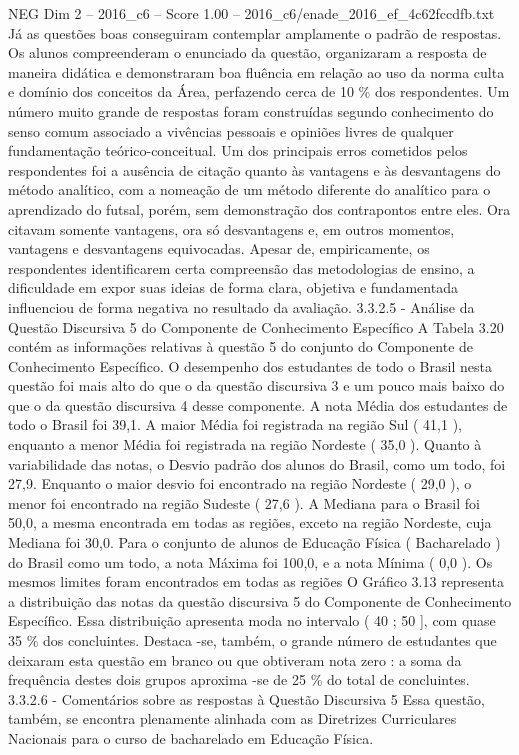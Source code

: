 \begin{textsample}{NEG Dim 2 – 2016\_c6 – Score 1.00 – 2016\_c6/enade\_2016\_ef\_4c62fccdfb.txt}
Já as questões boas conseguiram contemplar amplamente o padrão de respostas.
Os alunos compreenderam o enunciado da questão, organizaram a resposta de maneira didática e demonstraram boa fluência em relação ao uso da norma culta e domínio dos conceitos da Área, perfazendo cerca de 10 \% dos respondentes.
Um número muito grande de respostas foram construídas segundo conhecimento do senso comum associado a vivências pessoais e opiniões livres de qualquer fundamentação teórico-conceitual.
Um dos principais erros cometidos pelos respondentes foi a ausência de citação quanto às vantagens e às desvantagens do método analítico, com a nomeação de um método diferente do analítico para o aprendizado do futsal, porém, sem demonstração dos contrapontos entre eles.
Ora citavam somente vantagens, ora só desvantagens e, em outros momentos, vantagens e desvantagens equivocadas.
Apesar de, empiricamente, os respondentes identificarem certa compreensão das metodologias de ensino, a dificuldade em expor suas ideias de forma clara, objetiva e fundamentada influenciou de forma negativa no resultado da avaliação. 3.3.2.5 - Análise da Questão Discursiva 5 do Componente de Conhecimento Específico A Tabela 3.20 contém as informações relativas à questão 5 do conjunto do Componente de Conhecimento Específico.
O desempenho dos estudantes de todo o Brasil nesta questão foi mais alto do que o da questão discursiva 3 e um pouco mais baixo do que o da questão discursiva 4 desse componente.
A nota Média dos estudantes de todo o Brasil foi 39,1.
A maior Média foi registrada na região Sul ( 41,1 ), enquanto a menor Média foi registrada na região Nordeste ( 35,0 ).
Quanto à variabilidade das notas, o Desvio padrão dos alunos do Brasil, como um todo, foi 27,9.
Enquanto o maior desvio foi encontrado na região Nordeste ( 29,0 ), o menor foi encontrado na região Sudeste ( 27,6 ).
A Mediana para o Brasil foi 50,0, a mesma encontrada em todas as regiões, exceto na região Nordeste, cuja Mediana foi 30,0.
Para o conjunto de alunos de Educação Física ( Bacharelado ) do Brasil como um todo, a nota Máxima foi 100,0, e a nota Mínima ( 0,0 ).
Os mesmos limites foram encontrados em todas as regiões O Gráfico 3.13 representa a distribuição das notas da questão discursiva 5 do Componente de Conhecimento Específico.
Essa distribuição apresenta moda no intervalo ( 40 ; 50 ], com quase 35 \% dos concluintes.
Destaca -se, também, o grande número de estudantes que deixaram esta questão em branco ou que obtiveram nota zero : a soma da frequência destes dois grupos aproxima -se de 25 \% do total de concluintes. 3.3.2.6 - Comentários sobre as respostas à Questão Discursiva 5 Essa questão, também, se encontra plenamente alinhada com as Diretrizes Curriculares Nacionais para o curso de bacharelado em Educação Física.

\end{textsample}
